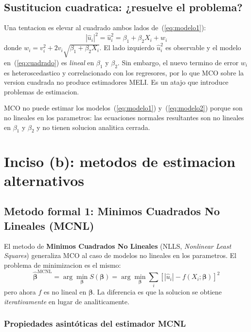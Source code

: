 \documentclass[12pt, letterpaper]{article}
\theoremstyle{remark}
\begin{document}
\subsection{Sustitucion cuadratica: ¿resuelve el problema?}

Una tentacion es elevar al cuadrado ambos lados de~(\ref{eq:modelo1}):
\begin{equation}
  |\hat u_i|^2 = \hat u_i^2 = \beta_1 + \beta_2 X_i + w_i
  \label{eq:cuadrado}
\end{equation}
donde $w_i = v_i^2 + 2v_i\sqrt{\beta_1 + \beta_2 X_i}$. El lado izquierdo
$\hat u_i^2$ es observable y el modelo en~(\ref{eq:cuadrado}) es \emph{lineal}
en $\beta_1$ y $\beta_2$. Sin embargo, el nuevo termino de error $w_i$ es
heterosc­edastico y correlacionado con los regresores, por lo que MCO sobre
la version cuadrada no produce estimadores MELI. Es un atajo que introduce
problemas de estimacion.

\begin{clave}
  MCO no puede estimar los modelos~(\ref{eq:modelo1}) y~(\ref{eq:modelo2}) porque
  son no lineales en los parametros: las ecuaciones normales resultantes son
  no lineales en $\beta_1$ y $\beta_2$ y no tienen solucion analitica cerrada.
\end{clave}

\section{Inciso (b): metodos de estimacion alternativos}

\subsection{Metodo formal 1: Minimos Cuadrados No Lineales (MCNL)}

El metodo de \textbf{Minimos Cuadrados No Lineales} (NLLS, \textit{Nonlinear
Least Squares}) generaliza MCO al caso de modelos no lineales en los parametros.
El problema de minimizacion es el mismo:
\begin{equation}
  \hat{\boldsymbol\beta}^{\text{MCNL}}
    = \arg\min_{\boldsymbol\beta} S(\boldsymbol\beta)
    = \arg\min_{\boldsymbol\beta} \sum_i [|\hat u_i| - f(X_i; \boldsymbol\beta)]^2
  \label{eq:MCNL}
\end{equation}
pero ahora $f$ es no lineal en $\boldsymbol\beta$. La diferencia es que la
solucion se obtiene \emph{iterativamente} en lugar de analiticamente.

\subsubsection{Propiedades asintóticas del estimador MCNL}
\end{document}
